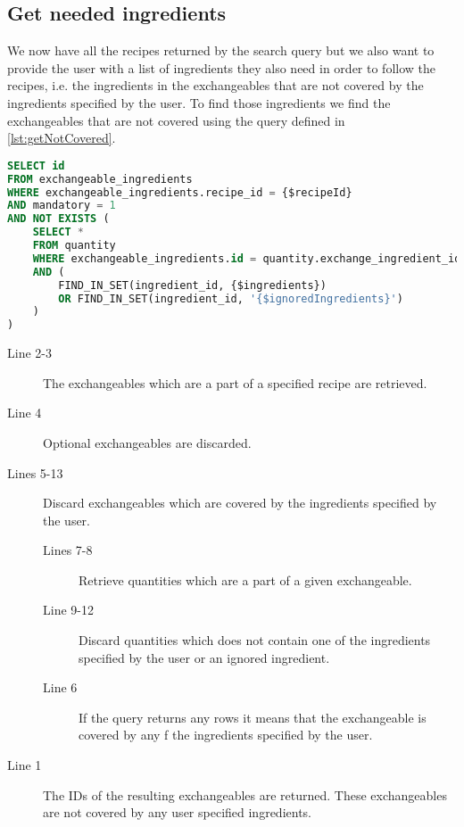 \subsection*{Get needed ingredients}
We now have all the recipes returned by the search query but we also want to provide the user with a list of ingredients they also need in order to follow the recipes, i.e. the ingredients in the exchangeables that are not covered by the ingredients specified by the user. To find those ingredients we find the exchangeables that are not covered using the query defined in \autoref{lst:getNotCovered}.
\begin{lstlisting}[language=SQL, morekeywords={FIND_IN_SET}, float=h, label={lst:getNotCovered}, caption={Query to find the exchangeables that are not covered.}]
SELECT id
FROM exchangeable_ingredients
WHERE exchangeable_ingredients.recipe_id = {$recipeId}
AND mandatory = 1
AND NOT EXISTS (
    SELECT * 
    FROM quantity
    WHERE exchangeable_ingredients.id = quantity.exchange_ingredient_id
    AND (
    	FIND_IN_SET(ingredient_id, {$ingredients})
    	OR FIND_IN_SET(ingredient_id, '{$ignoredIngredients}')
    )
)
\end{lstlisting}
\begin{description}
\item[Line 2-3] The exchangeables which are a part of a specified recipe are retrieved.
\item[Line 4] Optional exchangeables are discarded.
\item[Lines 5-13] Discard exchangeables which are covered by the ingredients specified by the user.
	\begin{description}
	\item[Lines 7-8] Retrieve quantities which are a part of a given exchangeable.
	\item[Line 9-12] Discard quantities which does not contain one of the ingredients specified by the user or an ignored ingredient.
	\item[Line 6] If the query returns any rows it means that the exchangeable is covered by any f the ingredients specified by the user.
	\end{description}
\item[Line 1] The IDs of the resulting exchangeables are returned. These exchangeables are not covered by any user specified ingredients.
\end{description}


